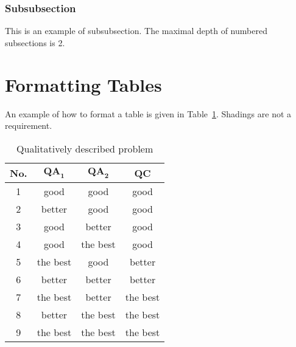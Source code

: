 \subsubsection{Subsubsection}
This is an example of subsubsection. The maximal depth of numbered subsections is 2.

\section{Formatting Tables}
An example of how to format a table is given in Table~\ref{tbl:QQqual}. Shadings are not a requirement.

\begin{table}[!ht]
\centering
\caption{Qualitatively described problem}
\begin{tabular}{cccc}
\toprule 
\textbf{No.} & ${{\mathbf {QA}}}_{{\mathbf 1}}$\textbf{} & ${{\mathbf {QA}}}_{{\mathbf 2}}$\textbf{} & 		\textbf{QC} \\
\midrule
1 & good & good  & good \\ 
2 & better & good & good \\ 
3 & good & better & good \\ 
4 & good & the best & good \\ 
\rowcolor[gray]{0.9} 5 & the best & good & better\\ 
\rowcolor[gray]{0.9} 6 & better & better & better \\ 
7 & the best & better & the best \\ 
8 & better & the best & the best \\ 
9 & the best & the best & the best \\ 
\bottomrule 
\end{tabular}
\label{tbl:QQqual}
\hspace{0.5cm}
\end{table}


%
%
%
